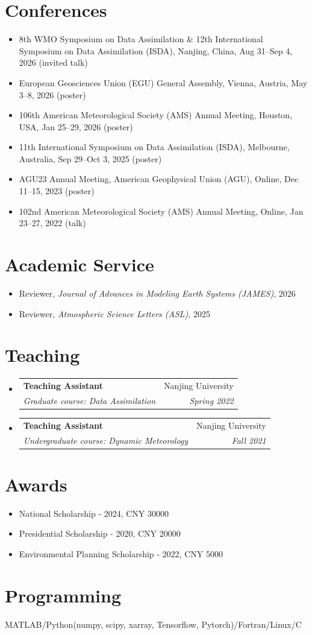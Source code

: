 \documentclass[a4paper,26pt]{article}
\makeatletter
\newcommand{\resumeSubheading}[4]{
  \vspace{-1pt}\item
    \begin{tabular*}{0.97\textwidth}{l@{\extracolsep{\fill}}r}
      \textbf{#1} & #2 \\
      \textit{#3} & \textit{#4} \\
    \end{tabular*}\vspace{-5pt}
}
\newcommand{\resumeSubHeadingListStart}{\begin{itemize}[leftmargin=*]}
\newcommand{\resumeSubHeadingListEnd}{\end{itemize}}
\makeatother
\begin{document}
\section{Conferences}
\resumeSubHeadingListStart
\item{8th WMO Symposium on Data Assimilation \& 12th International Symposium on Data Assimilation (ISDA), Nanjing, China, Aug 31--Sep 4, 2026 (invited talk)}
\item{European Geosciences Union (EGU) General Assembly, Vienna, Austria, May 3--8, 2026 (poster)}
\item{106th American Meteorological Society (AMS) Annual Meeting, Houston, USA, Jan 25--29, 2026 (poster)}
\item{11th International Symposium on Data Assimilation (ISDA), Melbourne, Australia, Sep 29--Oct 3, 2025 (poster)}
\item{AGU23 Annual Meeting, American Geophysical Union (AGU), Online, Dec 11--15, 2023 (poster)}
\item{102nd American Meteorological Society (AMS) Annual Meeting, Online, Jan 23--27, 2022 (talk)}
\resumeSubHeadingListEnd

\section{Academic Service}
\resumeSubHeadingListStart
\item{Reviewer, \textit{Journal of Advances in Modeling Earth Systems (JAMES)}, 2026}
\item{Reviewer, \textit{Atmospheric Science Letters (ASL)}, 2025}
\resumeSubHeadingListEnd

\section{Teaching}
\resumeSubHeadingListStart
\resumeSubheading {Teaching Assistant}{Nanjing University}
{Graduate course: Data Assimilation} {Spring 2022}
\resumeSubheading {Teaching Assistant}{Nanjing University}
{Undergraduate course: Dynamic Meteorology}{Fall 2021}
\resumeSubHeadingListEnd
\vspace{+0pt}

\section{Awards}
\resumeSubHeadingListStart
\item {National Scholarship - 2024, CNY 30000}
\item {Presidential Scholarship - 2020, CNY 20000}
\item {Environmental Planning Scholarship - 2022, CNY 5000}
\resumeSubHeadingListEnd

\section{Programming}
MATLAB/Python(numpy, scipy, xarray, Tensorflow, Pytorch)/Fortran/Linux/C
\end{document}
